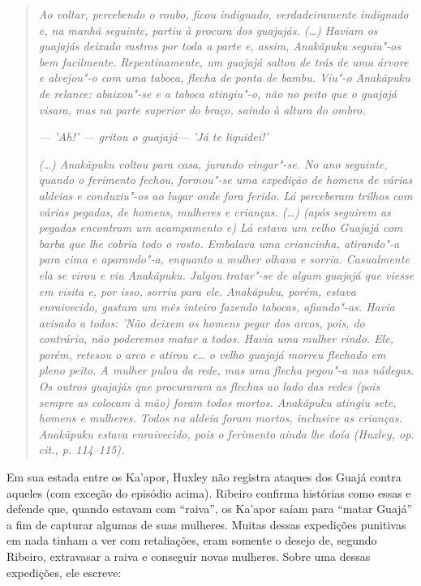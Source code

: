 \begin{quote}
\emph{Ao voltar, percebendo o roubo, ficou indignado, verdadeiramente
indignado e, na manhã seguinte, partiu à procura dos guajajás. (\ldots{})
Haviam os guajajás deixado rastros por toda a parte e, assim, Anakãpuku
seguiu"-os bem facilmente. Repentinamente, um guajajá saltou de trás de
uma árvore e alvejou"-o com uma taboca, flecha de ponta de bambu. Viu"-o
Anakãpuku de relance: abaixou"-se e a taboca atingiu"-o, não no peito que
o guajajá visara, mas na parte superior do braço, saindo à altura do
ombro.}

\noindent\emph{--- 'Ah!' --- gritou o guajajá--- 'Já te liquidei!'}

\noindent\emph{(\ldots{}) Anakãpuku voltou para casa, jurando vingar"-se. No ano seguinte,
quando o ferimento fechou, formou"-se uma expedição de homens de várias
aldeias e conduziu"-os ao lugar onde fora ferido. Lá perceberam trilhos
com várias pegadas, de homens, mulheres e crianças. (\ldots{}) (após seguirem
as pegadas encontram um acampamento e) Lá estava um velho Guajajá com
barba que lhe cobria todo o rosto. Embalava uma criancinha, atirando"-a
para cima e aparando"-a, enquanto a mulher olhava e sorria. Casualmente
ela se virou e viu Anakãpuku. Julgou tratar"-se de algum guajajá que
viesse em visita e, por isso, sorriu para ele. Anakãpuku, porém, estava
enraivecido, gastara um mês inteiro fazendo tabocas, afiando"-as. Havia
avisado a todos: 'Não deixem os homens pegar dos arcos, pois, do
contrário, não poderemos matar a todos. Havia uma mulher rindo. Ele,
porém, retesou o arco e atirou e\ldots{} o velho guajajá morreu flechado em
pleno peito. A mulher pulou da rede, mas uma flecha pegou"-a nas nádegas.
Os outros guajajás que procuraram as flechas ao lado das redes (pois
sempre as colocam à mão) foram todos mortos. Anakãpuku atingiu sete,
homens e mulheres. Todos na aldeia foram mortos, inclusive as crianças.
Anakãpuku estava enraivecido, pois o ferimento ainda lhe doía (Huxley,
\emph{op. cit.}, p. 114--115).}
\end{quote}

Em sua estada entre os Ka'apor, Huxley não registra ataques dos Guajá
contra aqueles (com exceção do episódio acima). Ribeiro confirma
histórias como essas e defende que, quando estavam com ``raiva'', os
Ka'apor saíam para ``matar Guajá'' a fim de capturar algumas de suas
mulheres. Muitas dessas expedições punitivas em nada tinham a ver com
retaliações, eram somente o desejo de, segundo Ribeiro, extravasar a
raiva e conseguir novas mulheres. Sobre uma dessas expedições, ele
escreve:

